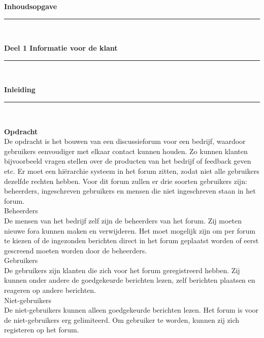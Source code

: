 \documentclass[a4paper,12pt]{article}
\newcommand{\HRule}{\rule{\linewidth}{0.5mm}}
\begin{document}


\newpage
\begin{center}
{ \LARGE \bfseries Inhoudsopgave}\\[0.1cm]
\HRule \\[0.5cm]
\end{center}

\newpage
\begin{center}
{\LARGE \bfseries Deel 1 Informatie voor de klant}\\[0.1cm]
\HRule \\[0.5cm]
\end{center}

\newpage
\begin{center}
{ \LARGE \bfseries Inleiding}\\[0.1cm]
\HRule \\[0.5cm]
\end{center}
{\bfseries Opdracht}\\
De opdracht is het bouwen van een discussieforum voor een bedrijf, waardoor gebruikers eenvoudiger met elkaar contact kunnen houden. Zo kunnen klanten bijvoorbeeld vragen stellen over de producten van het bedrijf of feedback geven etc. Er moet een hi\"erarchie systeem in het forum zitten, zodat niet alle gebruikers dezelfde rechten hebben.
Voor dit forum zullen er drie soorten gebruikers zijn: beheerders, ingeschreven gebruikers en mensen die niet ingeschreven staan in het forum.\\

Beheerders\\
De mensen van het bedrijf zelf zijn  de beheerders van het forum. Zij moeten nieuwe fora kunnen maken en verwijderen. Het moet mogelijk zijn om per forum te kiezen of de ingezonden berichten direct in het forum geplaatst worden of eerst gescreend moeten worden door de beheerders.\\

Gebruikers\\
De gebruikers zijn klanten die zich voor  het forum geregistreerd hebben. Zij kunnen onder andere de goedgekeurde berichten lezen, zelf berichten plaatsen en reageren op andere berichten. \\

Niet-gebruikers\\
De niet-gebruikers kunnen alleen goedgekeurde berichten lezen. Het forum is voor de niet-gebruikers erg gelimiteerd. Om gebruiker te worden, kunnen zij zich registeren op het forum. \\
\end{document}
